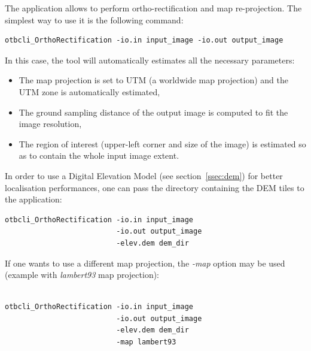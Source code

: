 The  application allows to
perform ortho-rectification and map re-projection. The simplest way to
use it is the following command:
\begin{verbatim}
otbcli_OrthoRectification -io.in input_image -io.out output_image
\end{verbatim}

In this case, the tool will automatically estimates all the necessary
parameters:
\begin{itemize}
\item The map projection is set to UTM (a worldwide map projection)
  and the UTM zone is automatically estimated,
\item The ground sampling distance of the output image is computed to
  fit the image resolution,
\item The region of interest (upper-left corner and size of the image)
  is estimated so as to contain the whole input image extent.
\end{itemize}

In order to use a Digital Elevation Model (see section~\ref{ssec:dem})
for better localisation performances, one can pass the directory
containing the DEM tiles to the application:

\begin{verbatim}
otbcli_OrthoRectification -io.in input_image 
                          -io.out output_image 
                          -elev.dem dem_dir
\end{verbatim}

If one wants to use a different map projection, the \emph{-map}
option may be used (example with \emph{lambert93} map projection):

\begin{verbatim}

otbcli_OrthoRectification -io.in input_image 
                          -io.out output_image 
                          -elev.dem dem_dir 
                          -map lambert93

\end{verbatim}

